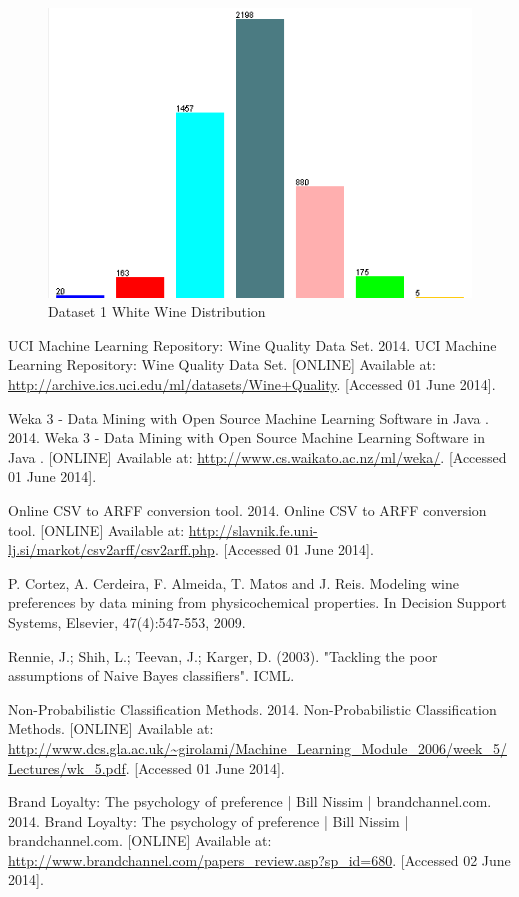 \documentclass[a4paper,12pt,openany]{report}
\begin{document}
\begin{figure}[ht!]
	\centering
	\includegraphics{images/whitewinedistribution}
	\caption{Dataset 1 White Wine Distribution}
	\label{fig:whitewinedist}
\end{figure}

\begin{thebibliography}{10}
	UCI Machine Learning Repository: Wine Quality Data Set. 2014. UCI Machine Learning Repository: Wine Quality Data Set. [ONLINE] Available at: \url{http://archive.ics.uci.edu/ml/datasets/Wine+Quality}. [Accessed 01 June 2014].

	Weka 3 - Data Mining with Open Source Machine Learning Software in Java . 2014. Weka 3 - Data Mining with Open Source Machine Learning Software in Java . [ONLINE] Available at: \url{http://www.cs.waikato.ac.nz/ml/weka/}. [Accessed 01 June 2014].

	Online CSV to ARFF conversion tool. 2014. Online CSV to ARFF conversion tool. [ONLINE] Available at: \url{http://slavnik.fe.uni-lj.si/markot/csv2arff/csv2arff.php}. [Accessed 01 June 2014].

	P. Cortez, A. Cerdeira, F. Almeida, T. Matos and J. Reis. Modeling wine preferences by data mining from physicochemical properties. In Decision Support Systems, Elsevier, 47(4):547-553, 2009.

	Rennie, J.; Shih, L.; Teevan, J.; Karger, D. (2003). "Tackling the poor assumptions of Naive Bayes classifiers". ICML.

	Non-Probabilistic Classiﬁcation Methods. 2014. Non-Probabilistic Classiﬁcation Methods. [ONLINE] Available at: \url{http://www.dcs.gla.ac.uk/~girolami/Machine_Learning_Module_2006/week_5/Lectures/wk_5.pdf}. [Accessed 01 June 2014].

	Brand Loyalty: The psychology of preference | Bill Nissim | brandchannel.com. 2014. Brand Loyalty: The psychology of preference | Bill Nissim | brandchannel.com. [ONLINE] Available at: \url{http://www.brandchannel.com/papers_review.asp?sp_id=680}. [Accessed 02 June 2014].

\end{thebibliography}
\end{document}
